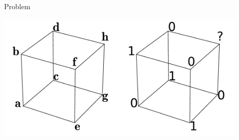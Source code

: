 \documentclass{beamer}
\begin{document}
\begin{frame}{Problem}
  \begin{center}
    \includegraphics[width=0.9\textwidth]{figures/classification_problem.pdf}
  \end{center}
\end{frame}
\end{document}
